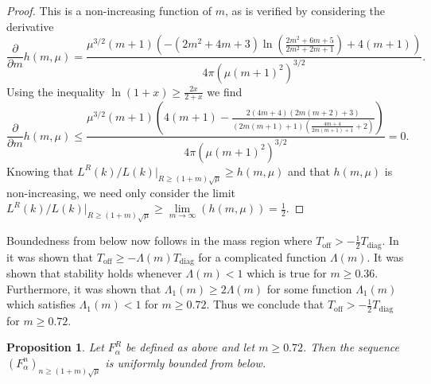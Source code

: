 \documentclass[a4paper,11pt]{article}
\newtheorem{proposition}{Proposition}
\numberwithin{equation}{section}
\begin{document}
\begin{proof}
	 This is a non-increasing function of $ m $, as is verified by considering the derivative\begin{equation}
	 \frac{\partial}{\partial m}h(m,\mu)=\frac{\mu ^{3/2} (m+1) \left(-\left(2 m^2+4 m+3\right) \ln \left(\frac{ 2 m^2+6 m+5}{2 m^2+2 m+1}\right)+4 (m+1)\right)}{4 \pi 
	 	\left(\mu  (m+1)^2\right)^{3/2}}.
	 \end{equation}
	 Using the inequality $ \ln(1+x)\geq\frac{2x}{2+x} $ we find \begin{equation}
	 \frac{\partial}{\partial m}h(m,\mu)\leq \frac{\mu ^{3/2} (m+1) \left(4 (m+1)-\frac{2 (4 m+4) (2 m (m+2)+3)}{(2 m (m+1)+1) \left(\frac{4 m+4}{2 m (m+1)+1}+2\right)}\right)}{4 \pi  \left(\mu  (m+1)^2\right)^{3/2}}=0.
	 \end{equation}
	 Knowing that $ L^R(k)/L(k)\rvert_{R\geq(1+m)\sqrt{\mu}}\geq h(m,\mu) $ and that $ h(m,\mu) $ is non-increasing, we need only consider the limit $ L^R(k)/L(k)\big\rvert_{R\geq(1+m)\sqrt{\mu}}\geq\lim\limits_{m\to\infty}\left(h(m,\mu)\right)=\frac{1}{2} $.
	\end{proof}
	Boundedness from below now follows in the mass region where $ T_{\text{off}}>-\frac{1}{2}T_{\text{diag}} $. In \cite{Moser_2017} it was shown that $ T_{\text{off}}\geq-\Lambda(m)T_{\text{diag}} $ for a complicated function $ \Lambda(m) $. It was shown that stability holds whenever $ \Lambda(m)<1 $ which is true for $ m\geq0.36 $. Furthermore, it was shown that $ \Lambda_1(m)\geq2\Lambda(m) $ for some function $ \Lambda_1(m) $ which satisfies $ \Lambda_1(m)<1 $ for $ m\geq0.72 $. Thus we conclude that $ T_{\text{off}}>-\frac{1}{2}T_{\text{diag}} $ for $ m\geq0.72 $.
	\begin{proposition}
		Let $ F^R_\alpha $ be defined as above and let $ m\geq0.72$. Then the sequence $ (F^n_\alpha)_{n\geq(1+m)\sqrt{\mu}} $ is uniformly bounded from below.
	\end{proposition}
\end{document}

